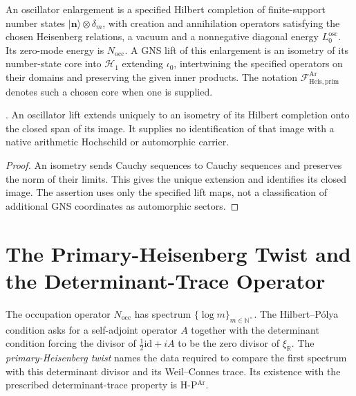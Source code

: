 \begin{definition}
\label{v4-arith:w5-b:def:fock}
\label{v4-arith:w5-b:def:bc-gns-heisenberg-lift}
An oscillator enlargement is a specified Hilbert completion of
finite-support number states $|\mathbf n\rangle\otimes\delta_m$,
with creation and annihilation operators satisfying the chosen
Heisenberg relations, a vacuum and a nonnegative diagonal energy
$L_0^{\mathrm{osc}}$. Its zero-mode energy is $N_{\mathrm{occ}}$.
A GNS lift of this enlargement is an isometry of its number-state
core into $\mathcal H_1$ extending $\iota_0$, intertwining the
specified operators on their domains and preserving the given
inner products. The notation
$\mathcal F^{\mathrm{Ar}}_{\mathrm{Heis},\mathrm{prim}}$ denotes
such a chosen core when one is supplied.
\end{definition}

\begin{lemma}
\label{v4-arith:w5-b:lem:fock-embeds-gns}
\ClaimStatusProvedHereConditional. An oscillator lift extends
uniquely to an isometry of its Hilbert completion onto the closed
span of its image. It supplies no identification of that image
with a native arithmetic Hochschild or automorphic carrier.
\end{lemma}
\begin{proof}
An isometry sends Cauchy sequences to Cauchy sequences and
preserves the norm of their limits. This gives the unique
extension and identifies its closed image. The assertion uses
only the specified lift maps, not a classification of additional
GNS coordinates as automorphic sectors.
\end{proof}

\section{The Primary-Heisenberg Twist and the Determinant-Trace Operator}
\label{v4-arith:w5-b:twist}

The occupation operator \(N_{\mathrm{occ}}\) has spectrum
\(\{\log m\}_{m\in\mathbb{N}^{\times}}\). The Hilbert--P\'olya
condition asks for a self-adjoint operator \(A\) together with
the determinant condition forcing the divisor of
\(\tfrac12\mathrm{id}+iA\) to be the zero divisor of
\(\xi_{\mathbb R}\). The \emph{primary-Heisenberg twist} names the
data required to compare the first spectrum with this determinant
divisor and its Weil--Connes trace. Its existence with the prescribed
determinant-trace property is H-P\(^{\mathrm{Ar}}\).

